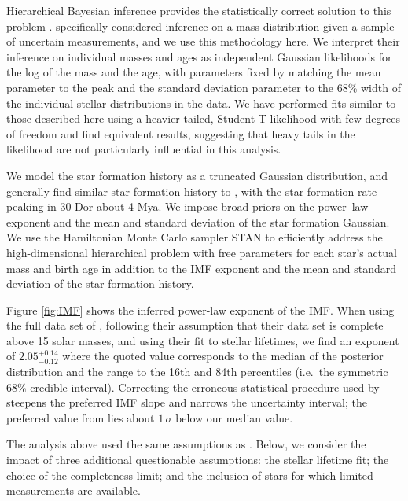 \documentclass[apjl]{emulateapj}
\newcommand{\onesigrange}[3]{\ensuremath{#1^{+#2}_{-#3}}}
\newcommand{\alpharangeone}{\onesigrange{2.05}{0.14}{0.12}}
\begin{document}
Hierarchical Bayesian inference provides the statistically correct solution to
this problem \citep{Hogg:2010}.  \citet{Mandel:2010stat} specifically considered
inference on a mass distribution given a sample of uncertain measurements, and
we use this methodology here.  We interpret their inference
on individual masses and ages as independent Gaussian likelihoods for the log
of the mass and the age, with parameters fixed by matching the mean parameter to the peak and the standard deviation parameter to the 68\% width of the
individual stellar distributions in the \citet{Schneider:2018} data.  We have performed fits similar to those described here using a heavier-tailed, Student T likelihood with few degrees of freedom and find equivalent results, suggesting that heavy tails in the likelihood are not particularly influential in this analysis.

We model the star formation history as a truncated Gaussian distribution, and
generally find similar star formation history to \citet{Schneider:2018}, with
the star formation rate peaking in 30 Dor about 4 Mya.  We impose broad priors
on the power--law exponent and the mean and standard deviation of the star
formation Gaussian.    We use the Hamiltonian Monte Carlo sampler STAN
\citep{STAN} to efficiently address the high-dimensional hierarchical problem
with free parameters for each star's actual mass and birth age in addition to
the IMF exponent and the mean and standard deviation of the star formation
history.

Figure \ref{fig:IMF} shows the inferred power-law exponent of the IMF.   When
using the full data set of \citet{Schneider:2018}, following their assumption
that their data set is complete above 15 solar masses, and using their fit to
stellar lifetimes, we find an exponent of $\alpharangeone$ where the quoted
value corresponds to the median of the posterior distribution and the range to
the 16th and 84th percentiles (i.e.\ the symmetric 68\% credible interval).  
Correcting the erroneous statistical procedure used by \citet{Schneider:2018}
steepens the preferred IMF slope and narrows the uncertainty interval; the
preferred value from \citet{Schneider:2018} lies about $1\, \sigma$ below our
median value.

The analysis above used the same assumptions as \citet{Schneider:2018}.  Below, we consider the impact of three additional questionable assumptions: the stellar lifetime fit; the choice of the completeness limit; and the inclusion of stars for which limited measurements are available.
\end{document}
